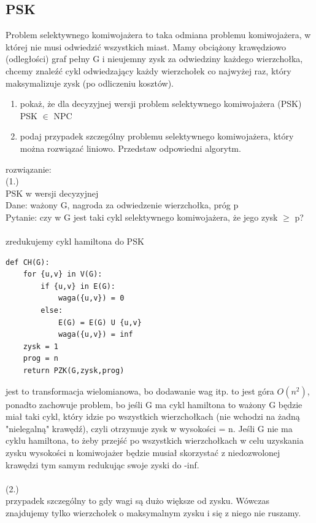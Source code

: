 \documentclass{article}
\begin{document}
\subsection*{PSK}
Problem selektywnego komiwojażera to taka odmiana problemu komiwojażera, w której nie musi
odwiedzić wszystkich miast. Mamy obciążony krawędziowo (odległości) graf pełny G i nieujemny zysk za odwiedziny każdego wierzchołka, 
chcemy znaleźć cykl odwiedzający każdy wierzchołek co najwyżej raz, który maksymalizuje zysk (po odliczeniu kosztów).
\begin{enumerate}
	\item pokaż, że dla decyzyjnej wersji problem selektywnego komiwojażera (PSK) PSK $\in$ NPC
	\item podaj przypadek szczególny problemu selektywnego komiwojażera,  który można rozwiązać liniowo. Przedstaw odpowiedni algorytm. 
\end{enumerate}
rozwiązanie: \\
(1.) \\
PSK w wersji decyzyjnej \\
Dane: ważony G, nagroda za odwiedzenie wierzchołka, próg p \\
Pytanie: czy w G jest taki cykl selektywnego komiwojażera, że jego zysk $\ge $ p? \\\\
zredukujemy cykl hamiltona do PSK
\begin{lstlisting}
def CH(G):
	for {u,v} in V(G):
		if {u,v} in E(G):
			waga({u,v}) = 0
		else:
			E(G) = E(G) U {u,v}
			waga({u,v}) = inf
	zysk = 1
	prog = n	
	return PZK(G,zysk,prog)
\end{lstlisting}
jest to transformacja wielomianowa, bo dodawanie wag itp. to jest góra $O(n^2)$,
ponadto zachowuje problem, bo jeśli G ma cykl hamiltona to ważony G będzie miał taki cykl, który idzie po wszystkich wierzchołkach
(nie wchodzi na żadną "nielegalną" krawędź), czyli otrzymuje zysk w wysokości = n. 
Jeśli G nie ma cyklu hamiltona,  to żeby przejść po wszystkich wierzchołkach w celu uzyskania zysku wysokości n komiwojażer
będzie musiał skorzystać z niedozwolonej krawędzi tym samym redukując swoje zyski do -inf. \\\\
(2.)\\
przypadek szczególny to gdy wagi są dużo większe od zysku. Wówczas znajdujemy tylko wierzchołek o maksymalnym zysku i się z niego nie ruszamy.
\end{document}
